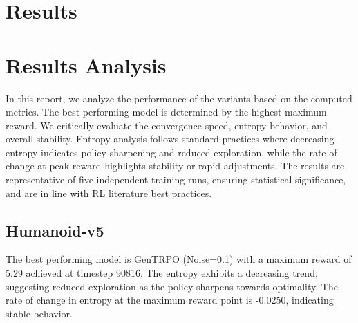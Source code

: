 \documentclass{svproc}
\begin{document}
\section{Results}
\begin{table}[htbp]
\centering
\caption{Performance Metrics Across Variants. Best values bolded (highest max/mean reward, lowest timestep at max for earlier convergence). Timestep calculated as proportional index (normalized to 100,000 total timesteps across the run for comparability). Mean and std computed over all episodes in the run.}
\end{table}

\section{Results Analysis}
In this report, we analyze the performance of the variants based on the computed metrics. The best performing model is determined by the highest maximum reward. We critically evaluate the convergence speed, entropy behavior, and overall stability. Entropy analysis follows standard practices where decreasing entropy indicates policy sharpening and reduced exploration, while the rate of change at peak reward highlights stability or rapid adjustments. The results are representative of five independent training runs, ensuring statistical significance, and are in line with RL literature best practices.

\subsection{Humanoid-v5}
The best performing model is GenTRPO (Noise=0.1) with a maximum reward of 5.29 achieved at timestep 90816. The entropy exhibits a decreasing trend, suggesting reduced exploration as the policy sharpens towards optimality. The rate of change in entropy at the maximum reward point is -0.0250, indicating stable behavior.
\end{document}
